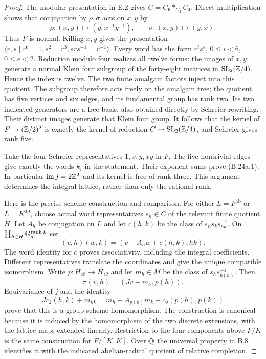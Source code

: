 \begin{proof}
The modular presentation in E.2 gives
$C=C_6*_{C_2}C_4$.  Direct multiplication shows that conjugation
by $\rho,\sigma$ acts on $x,y$ by
\[
 \rho:(x,y)\mapsto(y,x^{-1}y^{-1}),\qquad
 \sigma:(x,y)\mapsto(y,x).
 \tag{B.24a.3}
\]
Thus $F$ is normal.  Killing $x,y$ gives the presentation
$\langle r,s\mid r^6=1, s^2=r^3, srs^{-1}=r^{-1}\rangle$.
Every word has the form $r^is^e$, $0\le i<6$, $0\le e<2$.
Reduction modulo four realizes all twelve forms: the images of $x,y$
generate a normal Klein four subgroup of the forty-eight matrices in
$\mathrm{SL}_2(\mathbb Z/4)$.  Hence the index is twelve.  The two finite
amalgam factors inject into this quotient.  The subgroup therefore acts
freely on the amalgam tree; the quotient has five vertices and six
edges, and its fundamental group has rank two.  Its two indicated
generators are a free basis, also obtained directly by Schreier rewriting.
Their distinct images generate that Klein four group.  It follows that
the kernel of $F\to(\mathbb Z/2)^2$ is exactly the kernel of reduction
$C\to\mathrm{SL}_2(\mathbb Z/4)$, and Schreier gives rank five.

Take the four Schreier representatives $1,x,y,xy$ in $F$.
The five nontrivial edges give exactly the words $k_i$ in the
statement.  Their exponent sums prove (B.24a.1).  In particular
$\operatorname{im}j=2\mathbb Z^2$ and its kernel is free of rank three.
This argument determines the integral lattice, rather than only
the rational rank.

Here is the precise scheme construction and comparison.  For either
$L=F^{\mathrm{ab}}$ or $L=K^{\mathrm{ab}}$, choose actual word
representatives $s_h\in C$ of the relevant finite quotient $H$.
Let $A_h$ be conjugation on $L$ and let
$c(h,k)$ be the class of $s_hs_ks_{hk}^{-1}$.  On
$\coprod_{h\in H}\mathbb G_a^{\operatorname{rank}L}$ set
\[
 (v,h)(w,k)=(v+A_hw+c(h,k),hk).
 \tag{B.24a.4}
\]
The word identity for $c$ proves associativity, including the integral
coefficients.  Different representatives translate the coordinates and
give the unique compatible isomorphism.  Write $p:H_{48}\to H_{12}$
and let $m_h\in M$ be the class of $s_hs_{p(h)}^{-1}$.  Then
\[
                    \pi(v,h)=(Jv+m_h,p(h)).
 \tag{B.24a.5}
\]
Equivariance of $j$ and the identity
\[
 Jc_2(h,k)+m_{hk}
   =m_h+A_{p(h)}m_k+c_0(p(h),p(k))
\]
prove that this is a group-scheme homomorphism.  The construction is
canonical because it is induced by the homomorphism of the two discrete
extensions, with the lattice maps extended linearly.  Restriction to the
four components above $F/K$ is the same construction for $F/[K,K]$.
Over $\mathbb Q$ the universal property in B.8 identifies it with the indicated
abelian-radical quotient of relative completion.


\end{proof}
